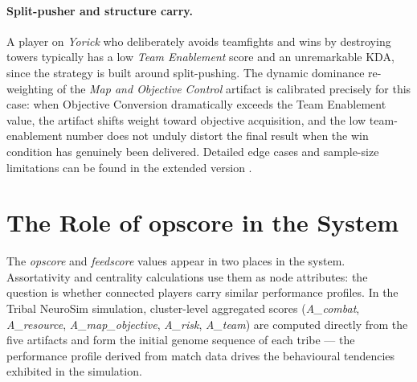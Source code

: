 \paragraph{Split-pusher and structure carry.}
A player on \textit{Yorick} who deliberately avoids teamfights and wins by destroying towers typically has a low \textit{Team Enablement} score and an unremarkable KDA, since the strategy is built around split-pushing. The dynamic dominance re-weighting of the \textit{Map and Objective Control} artifact is calibrated precisely for this case: when Objective Conversion dramatically exceeds the Team Enablement value, the artifact shifts weight toward objective acquisition, and the low team-enablement number does not unduly distort the final result when the win condition has genuinely been delivered. Detailed edge cases and sample-size limitations can be found in the extended version \cite{premadegraph-full}.

\section{The Role of opscore in the System}

The \textit{opscore} and \textit{feedscore} values appear in two places in the system. Assortativity and centrality calculations use them as node attributes: the question is whether connected players carry similar performance profiles. In the Tribal NeuroSim simulation, cluster-level aggregated scores (\textit{A\_combat}, \textit{A\_resource}, \textit{A\_map\_objective}, \textit{A\_risk}, \textit{A\_team}) are computed directly from the five artifacts and form the initial genome sequence of each tribe --- the performance profile derived from match data drives the behavioural tendencies exhibited in the simulation.
